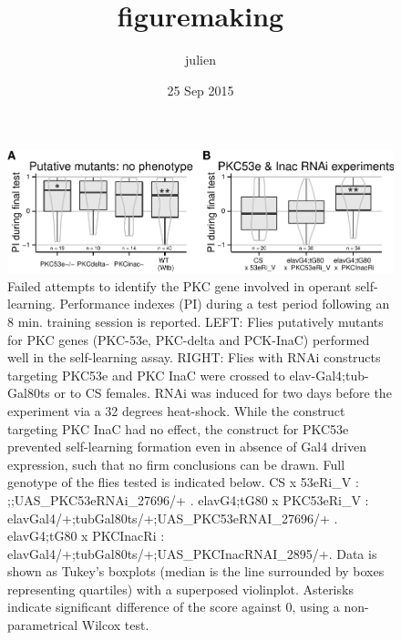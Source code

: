 \documentclass[]{article}
\title{figuremaking}
\author{julien}
\date{25 Sep 2015}
\begin{document}
\maketitle


\begin{figure}[htbp]
\centering
\includegraphics{firsttest_files/figure-latex/unnamed-chunk-2-1.pdf}
\caption{\label{fig:PKC} Failed attempts to identify the PKC gene
involved in operant self-learning. Performance indexes (PI) during a
test period following an 8 min. training session is reported. LEFT:
Flies putatively mutants for PKC genes (PKC-53e, PKC-delta and PCK-InaC)
performed well in the self-learning assay. RIGHT: Flies with RNAi
constructs targeting PKC53e and PKC InaC were crossed to
elav-Gal4;tub-Gal80ts or to CS females. RNAi was induced for two days
before the experiment via a 32 degrees heat-shock. While the construct
targeting PKC InaC had no effect, the construct for PKC53e prevented
self-learning formation even in absence of Gal4 driven expression, such
that no firm conclusions can be drawn. Full genotype of the flies tested
is indicated below. CS x 53eRi\_V : ;;UAS\_PKC53eRNAi\_27696/+ .
elavG4;tG80 x PKC53eRi\_V :
elavGal4/+;tubGal80ts/+;UAS\_PKC53eRNAI\_27696/+ . elavG4;tG80 x
PKCInacRi : elavGal4/+;tubGal80ts/+;UAS\_PKCInacRNAI\_2895/+. Data is
shown as Tukey's boxplots (median is the line surrounded by boxes
representing quartiles) with a superposed violinplot. Asterisks indicate
significant difference of the score against 0, using a non-parametrical
Wilcox test.}
\end{figure}
\end{document}
